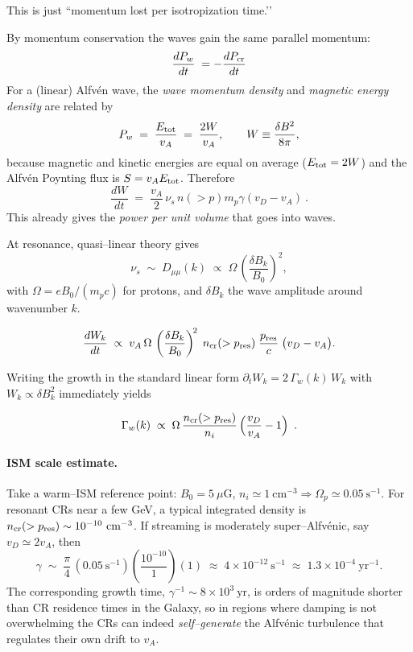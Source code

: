This is just “momentum lost per isotropization time.’’

By momentum conservation the waves gain the same parallel momentum:
\[
\frac{dP_{w}}{dt}\;=-\frac{dP_{\rm cr}}{dt}
\]
For a (linear) Alfv\'en wave, the \emph{wave momentum density} and \emph{magnetic energy
density} are related by
\[
P_{w} \;=\; \frac{E_{\rm tot}}{v_A} \;=\; \frac{2W}{v_A},
\qquad
W \equiv \frac{\delta B^2}{8\pi},
\]
because magnetic and kinetic energies are equal on average
(\(E_{\rm tot}=2W\)) and the Alfv\'en Poynting flux is \(S=v_A E_{\rm tot}\).
Therefore
\[
\frac{dW}{dt}\;=\;\frac{v_A}{2}\,\nu_s\,n(>p) m_p \gamma (v_D - v_A)~.
\]
This already gives the \emph{power per unit volume} that goes into waves.

At resonance, quasi–linear theory gives
\[
\nu_s \;\sim\; D_{\mu\mu}(k)
\;\propto\; \Omega\,\left(\frac{\delta B_k}{B_0}\right)^{\!2},
\]
with \(\Omega=eB_0/(m_pc)\) for protons, and \(\delta B_k\) the wave amplitude around
wavenumber \(k\). 

\[
\frac{dW_k}{dt}\;\propto\;
v_A\,\Omega\,
\left(\frac{\delta B_k}{B_0}\right)^{\!2}\;
n_{\rm cr}(>p_{\rm res})\;\frac{p_{\rm res}}{c}\;
\bigl(v_D - v_A\bigr).
\]

Writing the growth in the standard linear form
\(\partial_t W_k = 2\,\Gamma_w(k)\,W_k\) with \(W_k\propto \delta B_k^2\) immediately
yields
\begin{remark}
\[
\Gamma_w(k)\;\propto\;\Omega\,
\frac{n_{\rm cr}(>p_{\rm res})}{n_i}\,
\Bigl(\frac{v_D}{v_A}-1\Bigr)\,~.
\]
\end{remark}

\paragraph{ISM scale estimate.}
Take a warm–ISM reference point: \(B_0=5~\mu\mathrm G\),
\(n_i\simeq 1~\mathrm{cm^{-3}}\Rightarrow \Omega_p\simeq 0.05~\mathrm{s^{-1}}\).
For resonant CRs near a few GeV, a typical integrated density is
\(n_{\rm cr}(>p_{\rm res})\sim 10^{-10}~\mathrm{cm^{-3}}\).
If streaming is moderately super–Alfv\'enic, say \(v_D\simeq 2v_A\), then
\[
\gamma \;\sim\;
\frac{\pi}{4}\,(0.05~\mathrm{s^{-1}})
\left(\frac{10^{-10}}{1}\right)(1)
\;\approx\; 4\times10^{-12}~\mathrm{s^{-1}}
\;\approx\; 1.3\times10^{-4}~\mathrm{yr^{-1}}.
\]
The corresponding growth time, \( \gamma^{-1}\sim 8\times 10^{3}~\mathrm{yr}\),
is orders of magnitude shorter than CR residence times in the Galaxy, so in regions
where damping is not overwhelming the CRs can indeed \emph{self–generate} the
Alfv\'enic turbulence that regulates their own drift to \(v_A\).

